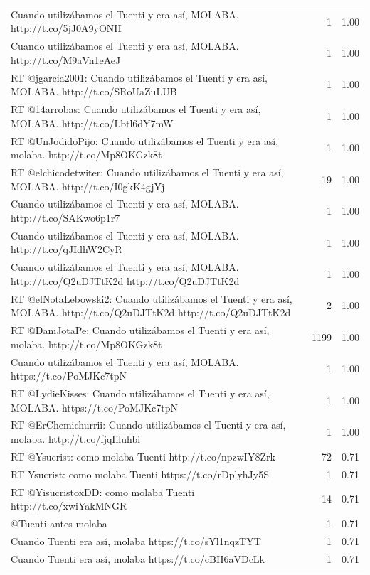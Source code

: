 \begin{longtable}{p{12.5cm}rr}
\bottomrule
\endlastfoot
Cuando utilizábamos el Tuenti y era así, MOLABA. http://t.co/5jJ0A9yONH & 1 & 1.00 \\
Cuando utilizábamos el Tuenti y era así, MOLABA. http://t.co/M9aVn1eAeJ & 1 & 1.00 \\
RT @jgarcia2001: Cuando utilizábamos el Tuenti y era así, MOLABA. http://t.co/SRoUaZuLUB & 1 & 1.00 \\
RT @14arrobas: Cuando utilizábamos el Tuenti y era así, MOLABA. http://t.co/Lbtl6dY7mW & 1 & 1.00 \\
RT @UnJodidoPijo: Cuando utilizábamos el Tuenti y era así, molaba. http://t.co/Mp8OKGzk8t & 1 & 1.00 \\
RT @elchicodetwiter: Cuando utilizábamos el Tuenti y era así, MOLABA. http://t.co/I0gkK4gjYj & 19 & 1.00 \\
Cuando utilizábamos el Tuenti y era así, MOLABA. http://t.co/SAKwo6p1r7 & 1 & 1.00 \\
Cuando utilizábamos el Tuenti y era así, MOLABA. http://t.co/qJIdhW2CyR & 1 & 1.00 \\
Cuando utilizábamos el Tuenti y era así, MOLABA. http://t.co/Q2uDJTtK2d http://t.co/Q2uDJTtK2d & 1 & 1.00 \\
RT @elNotaLebowski2: Cuando utilizábamos el Tuenti y era así, MOLABA. http://t.co/Q2uDJTtK2d http://t.co/Q2uDJTtK2d & 2 & 1.00 \\
RT @DaniJotaPe: Cuando utilizábamos el Tuenti y era así, molaba. http://t.co/Mp8OKGzk8t & 1199 & 1.00 \\
Cuando utilizábamos el Tuenti y era así, MOLABA. https://t.co/PoMJKc7tpN & 1 & 1.00 \\
RT @LydieKisses: Cuando utilizábamos el Tuenti y era así, MOLABA. https://t.co/PoMJKc7tpN & 1 & 1.00 \\
RT @ErChemichurrii: Cuando utilizábamos el Tuenti y era así, molaba. http://t.co/fjqIiluhbi & 1 & 1.00 \\
RT @Ysucrist: como molaba Tuenti http://t.co/npzwIY8Zrk & 72 & 0.71 \\
RT Ysucrist: como molaba Tuenti https://t.co/rDplyhJy5S & 1 & 0.71 \\
RT @YisucristoxDD: como molaba Tuenti http://t.co/xwiYakMNGR & 14 & 0.71 \\
@Tuenti antes molaba & 1 & 0.71 \\
Cuando Tuenti era así, molaba https://t.co/sYl1nqzTYT & 1 & 0.71 \\
Cuando Tuenti era así, molaba https://t.co/cBH6aVDcLk & 1 & 0.71 \\

\end{longtable}
\clearpage

